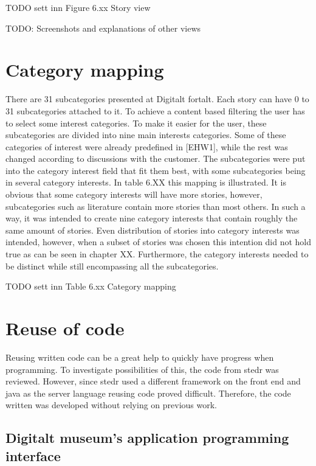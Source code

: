 TODO sett inn Figure 6.xx Story view\newline

TODO: Screenshots and explanations of other views

\section{Category mapping} 

There are 31 subcategories presented at Digitalt fortalt. Each story can have 0 to 31 subcategories attached to it. To achieve a content based filtering the user has to select some interest categories. To make it easier for the user, these subcategories are divided into nine main interests categories. Some of these categories of interest were already predefined in [EHW1], while the rest was changed according to discussions with the customer. The subcategories were put into the category interest field that fit them best, with some subcategories being in several category interests. In table 6.XX this mapping is illustrated. It is obvious that some category interests will have more stories, however, subcategories such as literature contain more stories than most others. In such a way, it was intended to create nine category interests that contain roughly the same amount of stories. Even distribution of stories into category interests was intended, however, when a subset of stories was chosen this intention did not hold true as can be seen in chapter XX. Furthermore, the category interests needed to be distinct while still encompassing all the subcategories. 

TODO sett inn Table 6.xx Category mapping

\section{Reuse of code}

Reusing written code can be a great help to quickly have progress when programming.  To investigate possibilities of this, the code from stedr was reviewed. However, since stedr used a different framework on the front end and java as the server language reusing code proved difficult. Therefore, the code written was developed without relying on previous work.

\subsection{Digitalt museum’s application programming interface}

